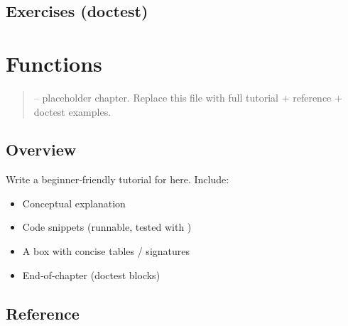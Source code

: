 \documentclass[a4paper,11pt,english]{sphinxmanual}
\begin{document}
\subsection{Exercises (doctest)}
\label{\detokenize{core_language/error_handling:exercises-doctest}}
\begin{sphinxVerbatim}[commandchars=\\\{\}]
\end{sphinxVerbatim}

\sphinxstepscope


\section{Functions}
\label{\detokenize{core_language/functions:functions}}\label{\detokenize{core_language/functions::doc}}\begin{quote}

\sphinxAtStartPar
{} – placeholder chapter. Replace this file with full tutorial + reference + doctest examples.
\end{quote}


\subsection{Overview}
\label{\detokenize{core_language/functions:overview}}
\sphinxAtStartPar
Write a beginner‑friendly tutorial for  here. Include:
\begin{itemize}
\item {} 
\sphinxAtStartPar
Conceptual explanation

\item {} 
\sphinxAtStartPar
Code snippets (runnable, tested with )

\item {} 
\sphinxAtStartPar
A  box with concise tables / signatures

\item {} 
\sphinxAtStartPar
End‑of‑chapter  (doctest blocks)

\end{itemize}


\subsection{Reference}
\label{\detokenize{core_language/functions:reference}}
\end{document}
